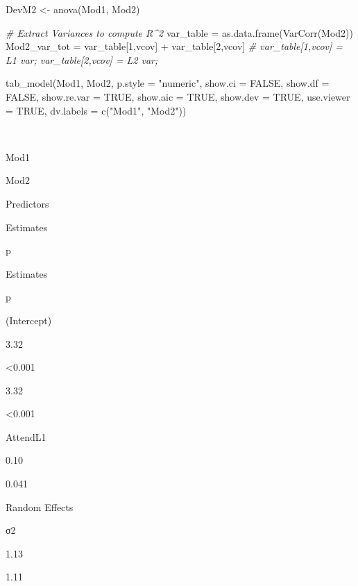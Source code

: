 \documentclass[
  11pt,
]{book}
\newenvironment{Shaded}{\begin{snugshade}}{\end{snugshade}}
\newcommand{\AttributeTok}[1]{\textcolor[rgb]{0.77,0.63,0.00}{#1}}
\newcommand{\CommentTok}[1]{\textcolor[rgb]{0.56,0.35,0.01}{\textit{#1}}}
\newcommand{\ConstantTok}[1]{\textcolor[rgb]{0.00,0.00,0.00}{#1}}
\newcommand{\DecValTok}[1]{\textcolor[rgb]{0.00,0.00,0.81}{#1}}
\newcommand{\FunctionTok}[1]{\textcolor[rgb]{0.00,0.00,0.00}{#1}}
\newcommand{\NormalTok}[1]{#1}
\newcommand{\OtherTok}[1]{\textcolor[rgb]{0.56,0.35,0.01}{#1}}
\newcommand{\SpecialCharTok}[1]{\textcolor[rgb]{0.00,0.00,0.00}{#1}}
\newcommand{\StringTok}[1]{\textcolor[rgb]{0.31,0.60,0.02}{#1}}
\begin{document}
\begin{Shaded}
\begin{Highlighting}[]
\NormalTok{DevM2 }\OtherTok{\textless{}{-}} \FunctionTok{anova}\NormalTok{(Mod1, Mod2) }

\CommentTok{\# Extract Variances to compute R\^{}2}
\NormalTok{  var\_table }\OtherTok{=} \FunctionTok{as.data.frame}\NormalTok{(}\FunctionTok{VarCorr}\NormalTok{(Mod2))}
\NormalTok{  Mod2\_var\_tot }\OtherTok{=}\NormalTok{ var\_table[}\DecValTok{1}\NormalTok{,}\StringTok{\textquotesingle{}vcov\textquotesingle{}}\NormalTok{] }\SpecialCharTok{+}\NormalTok{ var\_table[}\DecValTok{2}\NormalTok{,}\StringTok{\textquotesingle{}vcov\textquotesingle{}}\NormalTok{] }\CommentTok{\# var\_table[1,\textquotesingle{}vcov\textquotesingle{}] = L1 var; var\_table[2,\textquotesingle{}vcov\textquotesingle{}] = L2 var; }

\FunctionTok{tab\_model}\NormalTok{(Mod1, Mod2, }\AttributeTok{p.style =} \StringTok{"numeric"}\NormalTok{, }\AttributeTok{show.ci =} \ConstantTok{FALSE}\NormalTok{, }\AttributeTok{show.df =} \ConstantTok{FALSE}\NormalTok{, }\AttributeTok{show.re.var =} \ConstantTok{TRUE}\NormalTok{, }\AttributeTok{show.aic =} \ConstantTok{TRUE}\NormalTok{, }\AttributeTok{show.dev =} \ConstantTok{TRUE}\NormalTok{, }\AttributeTok{use.viewer =} \ConstantTok{TRUE}\NormalTok{, }\AttributeTok{dv.labels =} \FunctionTok{c}\NormalTok{(}\StringTok{"Mod1"}\NormalTok{, }\StringTok{"Mod2"}\NormalTok{))}
\end{Highlighting}
\end{Shaded}

~

Mod1

Mod2

Predictors

Estimates

p

Estimates

p

(Intercept)

3.32

\textless0.001

3.32

\textless0.001

AttendL1

0.10

0.041

Random Effects

σ2

1.13

1.11
\end{document}
